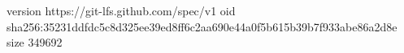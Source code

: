 version https://git-lfs.github.com/spec/v1
oid sha256:35231ddfdc5c8d325ee39ed8ff6c2aa690e44a0f5b615b39b7f933abe86a2d8e
size 349692
